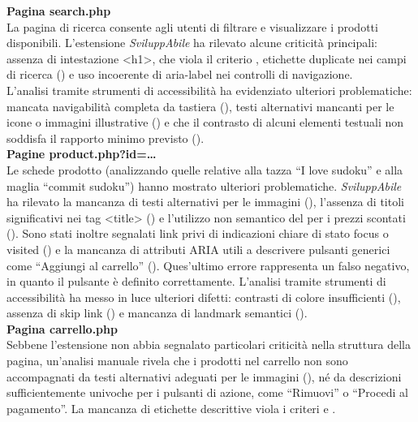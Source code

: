 \noindent \textbf{Pagina search.php}\\
La pagina di ricerca consente agli utenti di filtrare e visualizzare i prodotti disponibili. 
L’estensione \textit{SviluppAbile} ha rilevato alcune criticità principali: assenza di intestazione <h1>, che viola il criterio {}, etichette duplicate nei campi di ricerca ({}) e uso incoerente di aria-label nei controlli di navigazione.\\
L’analisi tramite strumenti di accessibilità ha evidenziato ulteriori problematiche: mancata navigabilità completa da tastiera ({}), testi alternativi mancanti per le icone o immagini illustrative ({}) e che il contrasto di alcuni elementi testuali non soddisfa il rapporto minimo previsto ({}).\\

\noindent \textbf{Pagine product.php?id=…}\\
Le schede prodotto (analizzando quelle relative alla tazza “I love sudoku” e alla maglia “commit sudoku”) hanno mostrato ulteriori problematiche. \textit{SviluppAbile} ha rilevato la mancanza di testi alternativi per le immagini ({}), l’assenza di titoli significativi nei tag <title> ({}) e l’utilizzo non semantico del  per i prezzi scontati ({}). Sono stati inoltre segnalati link privi di indicazioni chiare di stato focus o visited ({}) e la mancanza di attributi ARIA utili a descrivere pulsanti generici come “Aggiungi al carrello” ({}). Ques'ultimo errore rappresenta un falso negativo, in quanto il pulsante è definito correttamente.
L’analisi tramite strumenti di accessibilità ha messo in luce ulteriori difetti: contrasti di colore insufficienti ({}), assenza di skip link ({}) e mancanza di landmark semantici ({}).\\

\noindent \textbf{Pagina carrello.php}\\
Sebbene l’estensione non abbia segnalato particolari criticità nella struttura della pagina, un’analisi manuale rivela che i prodotti nel carrello non sono accompagnati da testi alternativi adeguati per le immagini ({}), né da descrizioni sufficientemente univoche per i pulsanti di azione, come “Rimuovi” o “Procedi al pagamento”. La mancanza di etichette descrittive viola i criteri {} e {}.\\

